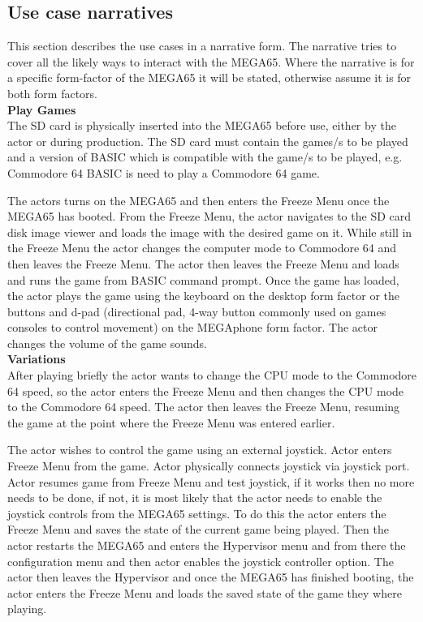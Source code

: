 \subsection{Use case narratives}
This section describes the use cases in a narrative form. The narrative tries to cover all the likely ways to interact with the MEGA65. Where the narrative is for a specific form-factor of the MEGA65 it will be stated, otherwise assume it is for both form factors. \\

\textbf{Play Games}\\
The SD card is physically inserted into the MEGA65 before use, either by the actor or during production. The SD card must contain the games/s to be played and a version of BASIC which is compatible with the game/s to be played, e.g. Commodore 64 BASIC is need to play a Commodore 64 game.

The actors turns on the MEGA65 and then enters the Freeze Menu once the MEGA65 has booted. From the Freeze Menu, the actor navigates to the SD card disk image viewer and loads the image with the desired game on it. While still in the Freeze Menu the actor changes the computer mode to Commodore 64 and then leaves the Freeze Menu. The actor then leaves the Freeze Menu and loads and runs the game from BASIC command prompt. Once the game has loaded, the actor plays the game using the keyboard on the desktop form factor or the buttons and d-pad (directional pad, 4-way button commonly used on games consoles to control movement) on the MEGAphone form factor. The actor changes the volume of the game sounds.\\

\textbf{Variations}\\
After playing briefly the actor wants to change the CPU mode to the Commodore 64 speed, so the actor enters the Freeze Menu and then changes the CPU mode to the Commodore 64 speed. The actor then leaves the Freeze Menu, resuming the game at the point where the Freeze Menu was entered earlier. 

The actor wishes to control the game using an external joystick. Actor enters Freeze Menu from the game. Actor physically connects joystick via joystick port. Actor resumes game from Freeze Menu and test joystick, if it works then no more needs to be done, if not, it is most likely that the actor needs to enable the joystick controls from the MEGA65 settings. To do this the actor enters the Freeze Menu and saves the state of the current game being played. Then the actor restarts the MEGA65 and enters the Hypervisor menu and from there the configuration menu and then actor enables the joystick controller option. The actor then leaves the Hypervisor and once the MEGA65 has finished booting, the actor enters the Freeze Menu and loads the saved state of the game they where playing. 

